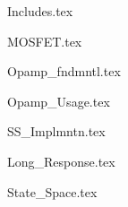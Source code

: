 \documentclass[a4paper, 12pt]{report}
\begin{document}
\begin{center}
{Includes.tex}
\begin{comment}
Start Level: Chapter
End Level: Chapter
Aditional Comments:
Rotational Kinematics
\end{comment}
{MOSFET.tex}
\begin{comment}
Start Level: Chapter
End Level: Chapter
Aditional Comments:
\end{comment}
{Opamp_fndmntl.tex}
\begin{comment}
Start Level: Chapter
End Level: Chapter
Aditional Comments:
\end{comment}
{Opamp_Usage.tex}
\begin{comment}
Start Level: Chapter
End Level: Chapter
Aditional Comments:
\end{comment}
{SS_Implmntn.tex}
\begin{comment}
Start Level: Chapter
End Level: Chapter
Aditional Comments:
\end{comment}
{Long_Response.tex}
\begin{comment}
Start Level: Chapter
End Level: Chapter
Aditional Comments:
\end{comment}
{State_Space.tex}
\begin{comment}
Start Level: Chapter
End Level: Chapter
Aditional Comments:
\end{comment}
\end{center}
\end{document}
